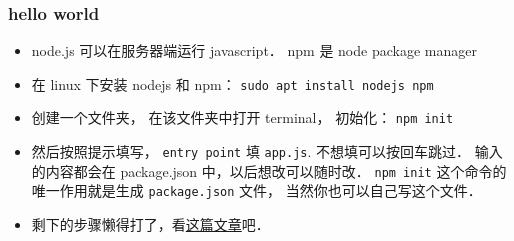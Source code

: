 
\begin{issues}
\issueDraft
\end{issues}


\subsubsection{hello world}
\begin{itemize}
\item node.js 可以在服务器端运行 javascript． npm 是 node package manager
\item 在 linux 下安装 nodejs 和 npm： \verb|sudo apt install nodejs npm|
\item 创建一个文件夹， 在该文件夹中打开 terminal， 初始化： \verb|npm init|
\item 然后按照提示填写， \verb|entry point| 填 \verb`app.js`. 不想填可以按回车跳过． 输入的内容都会在 package.json 中，以后想改可以随时改． \verb|npm init| 这个命令的唯一作用就是生成 \verb`package.json` 文件， 当然你也可以自己写这个文件．
\item 剩下的步骤懒得打了，看\href{https://medium.com/@adnanrahic/hello-world-app-with-node-js-and-express-c1eb7cfa8a30}{这篇文章}吧．
\end{itemize}
